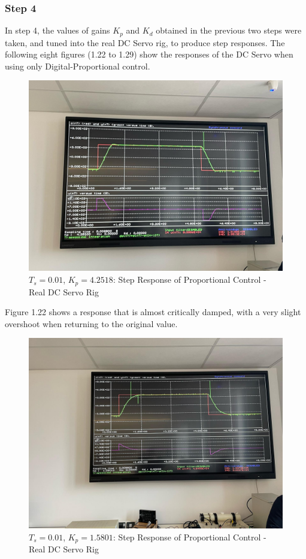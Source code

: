 \documentclass[stu, a4paper, 12pt, floatsintext]{apa7}
\numberwithin{figure}{section}
\numberwithin{table}{section}
\numberwithin{equation}{section}
\begin{document}
\subsubsection{Step 4}
In step 4, the values of gains $K_p$ and $K_d$ obtained in the previous two steps were taken, and tuned into the real DC Servo rig, to produce step responses. The following eight figures (1.22 to 1.29) show the responses of the DC Servo when using only Digital-Proportional control. 
\begin{figure}[H]
    \caption{$T_s = 0.01$, $K_p = 4.2518$: Step Response of Proportional Control - Real DC Servo Rig}
    \label{fig:0.01_Ts_step4_step_response_1}
    \centering
    \includegraphics[width=1.1\textwidth]{pictures/task4_kp_0.01_1}
\end{figure}
Figure 1.22 shows a response that is almost critically damped, with a very slight overshoot when returning to the original value.
\begin{figure}[H]
    \caption{$T_s = 0.01$, $K_p = 1.5801$: Step Response of Proportional Control - Real DC Servo Rig}
    \label{fig:0.01_Ts_step4_step_response_2}
    \centering
    \includegraphics[width=1.1\textwidth]{pictures/task4_kp_0.01_2}
\end{figure}
\end{document}
